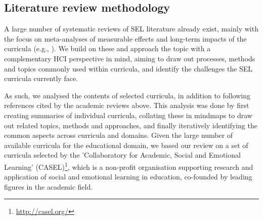 \documentclass[prodmode,acmtochi]{acmsmall}
\begin{document}



        
\subsection{Literature review methodology}      
\label{sec:methodology}
A large number of systematic reviews of SEL literature already exist, mainly with the focus on meta-analyses of measurable effects and long-term impacts of the curricula (e.g., \cite{Durlak2011,Weare2011,Adi2007a,Greenberg2010,Elbertson2009,Payton2008}). 
%
We build on these and approach the topic with a complementary HCI perspective in mind, aiming to draw out processes, methods and topics commonly used within curricula, and identify the challenges the SEL curricula currently face. 

As such, we analysed the contents of selected curricula, in addition to following references cited by the academic reviews above. This analysis was done by first creating summaries of individual curricula, collating these in mindmaps to draw out related topics, methods and approaches, and finally iteratively identifying the common aspects across curricula and domains. 
%
Given the large number of available curricula for the educational domain, we based our review on a set of curricula selected by the 'Collaboratory for Academic, Social and Emotional Learning' (CASEL)\footnote{\url{http://casel.org/}}, which is a non-profit organisation supporting research and application of social and emotional learning in education, co-founded by leading figures in the academic field. 
\end{document}
